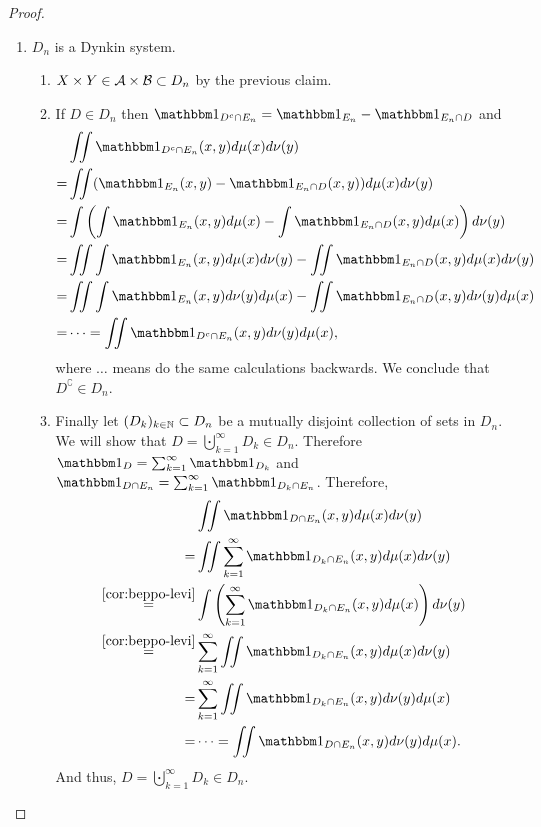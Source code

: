 \begin{proof}
\begin{enumerate}
		\item $D_n$ is a Dynkin system.
		\begin{enumerate}
			\item $X \times Y \in \mathcal{A} \times \mathcal{B} \subset D_n$ by the previous claim.
			\item If $D \in D_n$ then $\ind_{D^\complement \cap E_n} = \ind_{E_n} - \ind_{E_n \cap D}$ and
			\begin{align*}
				&\iint \ind_{D^\complement \cap E_n}(x, y) d\mu(x) d\nu(y) \\
				= & \iint (\ind_{E_n}(x, y) - \ind_{E_n \cap D}(x, y))d\mu(x) d\nu(y) \\
				= &\int \left( \int \ind_{E_n}(x, y) d\mu(x) - \int \ind_{E_n \cap D}(x, y) d\mu(x) \right)d\nu(y) \\
				= &\iint \int \ind_{E_n}(x, y) d\mu(x) d\nu(y) - \iint \ind_{E_n \cap D}(x, y) d\mu(x) d\nu(y) \\
				= &\iint \int \ind_{E_n}(x, y) d\nu(y)d\mu(x) - \iint \ind_{E_n \cap D}(x, y) d\nu(y)d\mu(x) \\
				= &\dots = \iint \ind_{D^\complement \cap E_n}(x, y) d\nu(y) d\mu(x),
			\end{align*}
			where $\dots$ means do the same calculations backwards. We conclude that $D^\complement \in D_n$.
			\item Finally let $(D_k)_{k\in \mathbb{N}} \subset D_n$ be a mutually disjoint collection of sets in $D_n$. We will show that $D = \bigcupdot_{k = 1}^\infty D_k \in D_n$. Therefore $\ind_{D} = \sum_{k = 1}^\infty \ind_{D_k}$ and $\ind_{D \cap E_n} = \sum_{k = 1}^\infty \ind_{D_k \cap E_n}$. Therefore,
			\begin{align*}
				&\iint \ind_{D \cap E_n}(x, y)d\mu(x)d\nu(y)\\
				= & \iint \sum_{k = 1}^\infty \ind_{D_k \cap E_n}(x, y) d\mu(x) d\nu(y)\\
				\overset{\ref{cor:beppo-levi}}{=} & \int \left( \sum_{k = 1}^\infty \ind_{D_k \cap E_n}(x, y) d\mu(x) \right) d\nu(y)\\
				\overset{\ref{cor:beppo-levi}}{=} & \sum_{k = 1}^\infty \iint \ind_{D_k \cap E_n}(x, y) d\mu(x) d\nu(y)\\
				= &\sum_{k = 1}^\infty \iint \ind_{D_k \cap E_n}(x, y) d\nu(y) d\mu(x)\\
				= &\dots = \iint \ind_{D \cap E_n}(x, y)d\nu(y)d\mu(x).
			\end{align*} 
			And thus, $D = \bigcupdot_{k = 1}^\infty D_k \in D_n$.
		\end{enumerate}
	

\end{enumerate}
\end{proof}
